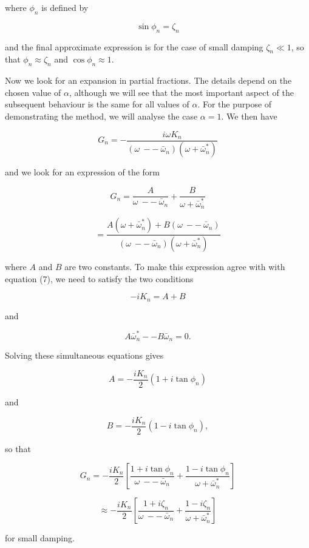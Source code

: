   where $\phi_n$ is defined by 

  $$\sin \phi_n = \zeta_n \tag{6}$$ 

  and the final approximate expression is for the case of small damping 
  $\zeta_n \ll 1$, so that $\phi_n \approx \zeta_n$ and $\cos \phi_n \approx 
  1$. 

  Now we look for an expansion in partial fractions. The details depend on the 
  chosen value of $\alpha$, although we will see that the most important aspect 
  of the subsequent behaviour is the same for all values of $\alpha$. For the 
  purpose of demonstrating the method, we will analyse the case $\alpha = 1$. 
  We then have 

  $$G_n = -\dfrac{i \omega K_n}{(\omega \mathrm{~} -- \mathrm{~} 
  \bar{\omega}_n)(\omega + \bar{\omega}^*_n)} \tag{7}$$ 

  and we look for an expression of the form 

  $$G_n = \dfrac{A}{\omega \mathrm{~} -- \mathrm{~} \bar{\omega}_n} + 
  \dfrac{B}{\omega + \bar{\omega}^*_n}$$ 

  $$=\dfrac{A(\omega + \bar{\omega}^*_n) + B(\omega \mathrm{~} -- \mathrm{~} 
  \bar{\omega}_n)}{(\omega \mathrm{~} -- \mathrm{~} \bar{\omega}_n)(\omega + 
  \bar{\omega}^*_n)} \tag{8}$$ 

  where $A$ and $B$ are two constants. To make this expression agree with with 
  equation (7), we need to satisfy the two conditions 

  $$-iK_n = A + B \tag{9}$$ 

  and 

  $$A \bar{\omega}^*_n -- B\bar{\omega}_n = 0 . \tag{10}$$ 

  Solving these simultaneous equations gives 

  $$A = -\dfrac{iK_n}{2}(1+ i\tan \phi_n) \tag{11}$$ 

  and 

  $$B = -\dfrac{iK_n}{2}(1- i\tan \phi_n) , \tag{12}$$ 

  so that 

  $$G_n = -\dfrac{iK_n}{2} \left[\dfrac{1+ i\tan \phi_n}{\omega \mathrm{~} -- 
  \mathrm{~} \bar{\omega}_n} + \dfrac{1- i\tan \phi_n}{\omega + 
  \bar{\omega}^*_n} \right] \tag{13}$$ 

  $$\approx -\dfrac{iK_n}{2} \left[\dfrac{1+ i\zeta_n}{\omega \mathrm{~} -- 
  \mathrm{~} \bar{\omega}_n} + \dfrac{1- i\zeta_n}{\omega + \bar{\omega}^*_n} 
  \right] \tag{14}$$ 

  for small damping. 

